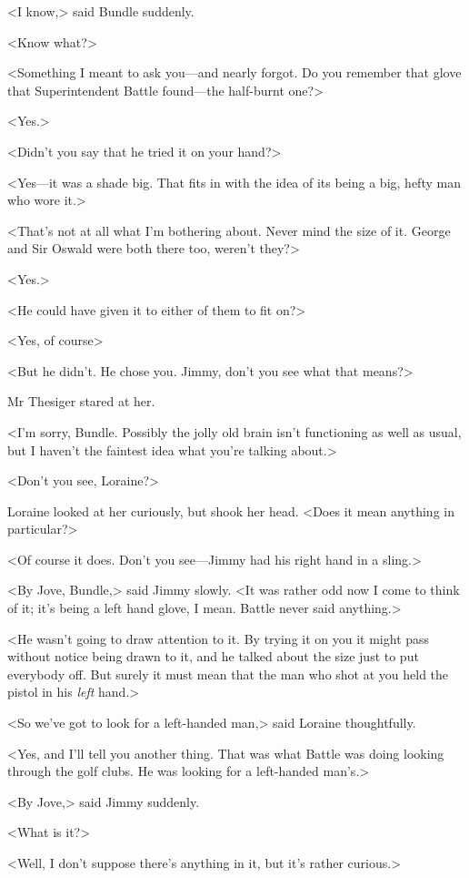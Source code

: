 <I know,> said Bundle suddenly.

<Know what?>

<Something I meant to ask you—and nearly forgot. Do you remember that glove that Superintendent Battle found—the half-burnt one?>

<Yes.>

<Didn't you say that he tried it on your hand?>

<Yes—it was a shade big. That fits in with the idea of its being a big, hefty man who wore it.>

<That's not at all what I'm bothering about. Never mind the size of it. George and Sir Oswald were both there too, weren't they?>

<Yes.>

<He could have given it to either of them to fit on?>

<Yes, of course\longdash>

<But he didn't. He chose you. Jimmy, don't you see what that means?>

Mr Thesiger stared at her.

<I'm sorry, Bundle. Possibly the jolly old brain isn't functioning as well as usual, but I haven't the faintest idea what you're talking about.>

<Don't you see, Loraine?>

Loraine looked at her curiously, but shook her head. <Does it mean anything in particular?>

<Of course it does. Don't you see—Jimmy had his right hand in a sling.>

<By Jove, Bundle,> said Jimmy slowly. <It was rather odd now I come to think of it; it's being a left hand glove, I mean. Battle never said anything.>

<He wasn't going to draw attention to it. By trying it on you it might pass without notice being drawn to it, and he talked about the size just to put everybody off. But surely it must mean that the man who shot at you held the pistol in his \emph{left} hand.>

<So we've got to look for a left-handed man,> said Loraine thoughtfully.

<Yes, and I'll tell you another thing. That was what Battle was doing looking through the golf clubs. He was looking for a left-handed man's.>

<By Jove,> said Jimmy suddenly.

<What is it?>

<Well, I don't suppose there's anything in it, but it's rather curious.>

